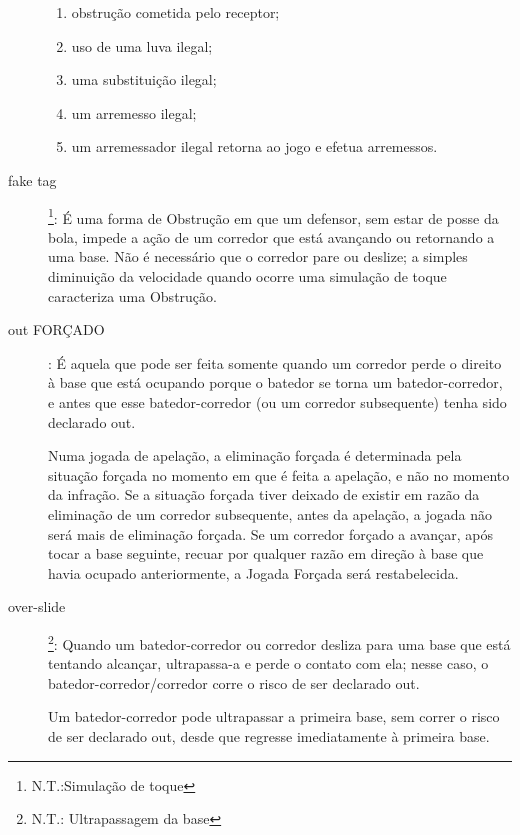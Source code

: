 \begin{description}
	\begin{enumerate}[label=\roman*.]
		\item  obstru\c{c}\~ao cometida pelo receptor; 
		\item uso de uma luva ilegal; 
		\item uma substitui\c{c}\~ao ilegal; 
		\item um arremesso ilegal; 
		\item um arremessador ilegal retorna ao jogo e efetua arremessos. 
	\end{enumerate}
	
	\item[\Gls{fake tag}]\footnote{N.T.:Simula\c{c}\~ao de toque}:	\'E uma forma de Obstru\c{c}\~ao em que um defensor, sem estar de posse da bola, impede a a\c{c}\~ao de um corredor que est\'a avan\c{c}ando ou retornando a uma base. N\~ao \'e necess\'ario que o corredor pare ou deslize; a simples diminui\c{c}\~ao da velocidade quando ocorre uma simula\c{c}\~ao de toque caracteriza uma Obstru\c{c}\~ao. 	
		
	\item[\gls{out} FOR\c{C}ADO]: \'E aquela que pode ser feita somente quando um corredor perde o direito \`a base que est\'a ocupando porque o batedor se torna um batedor-corredor, e antes que esse batedor-corredor (ou um corredor subsequente) tenha sido declarado \gls{out}. 
	
	Numa jogada de apela\c{c}\~ao, a elimina\c{c}\~ao for\c{c}ada \'e determinada pela situa\c{c}\~ao for\c{c}ada no momento em que \'e feita a apela\c{c}\~ao, e n\~ao no momento da infra\c{c}\~ao. 
	Se a situa\c{c}\~ao for\c{c}ada tiver deixado de existir em raz\~ao da elimina\c{c}\~ao de um corredor subsequente, antes da apela\c{c}\~ao, a jogada n\~ao ser\'a mais de elimina\c{c}\~ao for\c{c}ada. 
	Se um corredor for\c{c}ado a avan\c{c}ar, ap\'os tocar a base seguinte, recuar por qualquer raz\~ao em dire\c{c}\~ao \`a base que havia ocupado anteriormente, a Jogada For\c{c}ada ser\'a restabelecida. 
	
	\item[\gls{over-slide}]\footnote{N.T.: Ultrapassagem da base}: Quando um batedor-corredor ou corredor desliza para uma base que est\'a tentando alcan\c{c}ar, ultrapassa-a e perde o contato com ela; nesse caso, o batedor-corredor/corredor corre o risco de ser declarado \gls{out}. 
	
	Um batedor-corredor pode ultrapassar a primeira base, sem correr o risco de ser declarado \gls{out}, desde que regresse imediatamente \`a primeira base. 	
\end{description}

